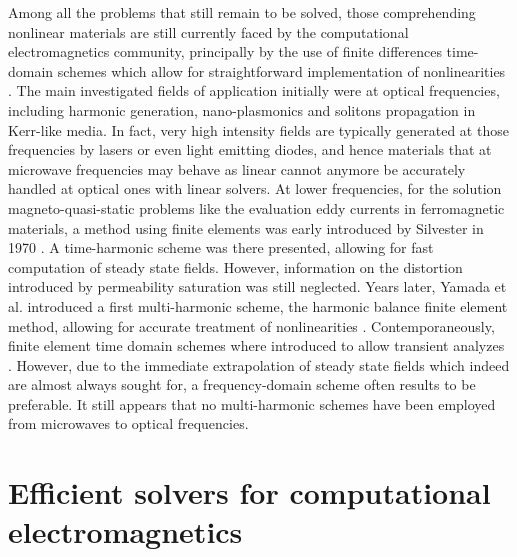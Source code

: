 Among all the problems that still remain to be solved, those comprehending nonlinear materials are still currently faced by the computational electromagnetics community, principally by the use of finite differences time-domain schemes which allow for straightforward implementation of nonlinearities \cite{goorjian1992direct, ziolkowski1993full, ziolkowski1994nonlinear, joseph1997fdtd, teixeira2008time, sasanpour2010analysis, potravkin2012numerical, frances2013split}. The main investigated fields of application initially were at optical frequencies, including harmonic generation, nano-plasmonics and solitons propagation in Kerr-like media. In fact, very high intensity fields are typically generated at those frequencies by lasers or even light emitting diodes, and hence materials that at microwave frequencies may behave as linear cannot anymore be accurately handled at optical ones with linear solvers. At lower frequencies, for the solution magneto-quasi-static problems like the evaluation eddy currents in ferromagnetic materials, a method using finite elements was early introduced by Silvester in 1970 \cite{silvester1970finite}. A time-harmonic scheme was there presented, allowing for fast computation of steady state fields. However, information on the distortion introduced by permeability saturation was still neglected. Years later, Yamada et al. \cite{yamada1988harmonic, yamada1989harmonic, yamada1991calculation} introduced a first multi-harmonic scheme, the harmonic balance finite element method, allowing for accurate treatment of nonlinearities \cite{gyselinck2002harmonic, pascal2003coupling, zhao2010analysis, zhao2011analysis}. Contemporaneously, finite element time domain schemes where introduced to allow transient analyzes \cite{biro1995various}. However, due to the immediate extrapolation of steady state fields which indeed are almost always sought for, a frequency-domain scheme often results to be preferable. It still appears that no multi-harmonic schemes have been employed from microwaves to optical frequencies.


\section[Efficient solvers for CEM]{Efficient solvers for computational electromagnetics}


